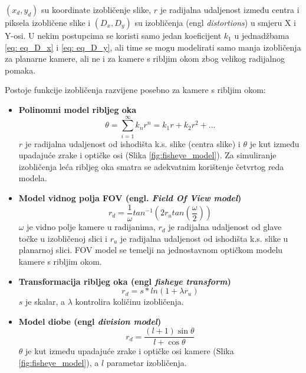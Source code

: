 \documentclass[../seminar.tex]{subfiles}
\begin{document}
$(x_d, y_d)$ su koordinate izobličenje slike, $r$ je radijalna udaljenost između centra i piksela izobličene slike i $(D_x, D_y)$ su izobličenja (engl \textit{distortions}) u smjeru X i Y-osi. U nekim postupcima se koristi samo jedan koeficijent $k_1$ u jednadžbama \ref{eq: eq_D_x} i \ref{eq: eq_D_y}, ali time se mogu modelirati samo manja izobličenja za planarne kamere, ali ne i za kamere s ribljim okom zbog velikog radijalnog pomaka. 
\clearpage

Postoje funkcije izobličenja razvijene posebno za kamere s ribljim okom:

\begin{itemize}
\setlength\itemsep{2em}
\item \textbf{Polinomni model ribljeg oka}
\begin{equation}
\theta = \sum\limits_{i=1}^\infty k_n r^n = k_1 r + k_2 r^2 + ...
\end{equation}
$r$ je radijalna udaljenost od ishodišta k.s. slike (centra slike) i $\theta$ je kut između upadajuće zrake i optičke osi (Slika \ref{fig:fisheye_model}). Za simuliranje izobličenja leća ribljeg oka smatra se adekvatnim korištenje četvrtog reda modela.

\item \textbf{Model vidnog polja FOV (engl. \textit{Field Of View model})}
\begin{equation}
r_d = \frac{1}{\omega}tan^{-1}(2r_u tan(\frac{\omega}{2}))
\end{equation}
$\omega$ je vidno polje kamere u radijanima, $r_d$ je radijalna udaljenost od glave točke u izobličenoj slici i $r_u$ je radijalna udaljenost od ishodišta k.s. slike u planarnoj slici. FOV model se temelji na jednostavnom optičkom modelu kamere s ribljim okom.

\item \textbf{Transformacija ribljeg oka (engl \textit{fisheye transform})}
\begin{equation}
r_d = s * ln(1 + \lambda r_u)
\end{equation}
$s$ je skalar, a $\lambda$ kontrolira količinu izobličenja.

\item \textbf{Model diobe (engl \textit{division model})}
\begin{equation}
r_d = \frac{(l + 1)\sin \theta}{l + \cos \theta}
\end{equation}
$\theta$ je kut između upadajuće zrake i optičke osi kamere (Slika \ref{fig:fisheye_model}), a $l$ parametar izobličenja.
\end{itemize}
\end{document}
